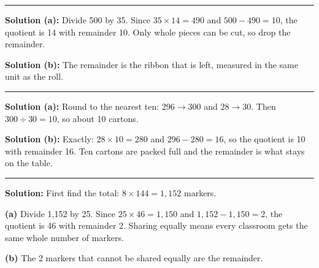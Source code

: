 \documentclass[12pt]{article}
\begin{document}
\vspace{0.2cm}\noindent\rule{\linewidth}{0.2pt}\vspace{0.2cm}


\textbf{Solution (a):} Divide 500 by 35. Since $35 \times 14 = 490$ and $500 - 490 = 10$, the quotient is 14 with remainder 10. Only whole pieces can be cut, so drop the remainder. 

\textbf{Solution (b):} The remainder is the ribbon that is left, measured in the same unit as the roll. 

\vspace{0.2cm}\noindent\rule{\linewidth}{0.2pt}\vspace{0.2cm}


\textbf{Solution (a):} Round to the nearest ten: $296 \to 300$ and $28 \to 30$. Then $300 \div 30 = 10$, so about 10 cartons. 

\textbf{Solution (b):} Exactly: $28 \times 10 = 280$ and $296 - 280 = 16$, so the quotient is 10 with remainder 16. Ten cartons are packed full and the remainder is what stays on the table. 

\vspace{0.2cm}\noindent\rule{\linewidth}{0.2pt}\vspace{0.2cm}


\textbf{Solution:} First find the total: $8 \times 144 = 1{,}152$ markers.

\textbf{(a)} Divide 1{,}152 by 25. Since $25 \times 46 = 1{,}150$ and $1{,}152 - 1{,}150 = 2$, the quotient is 46 with remainder 2. Sharing equally means every classroom gets the same whole number of markers. 

\textbf{(b)} The 2 markers that cannot be shared equally are the remainder. 
\end{document}
